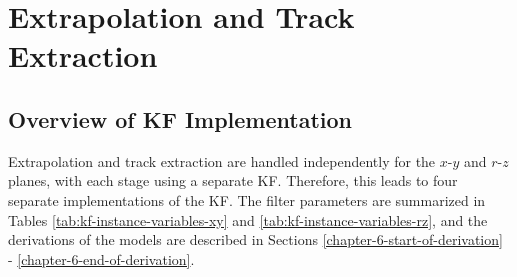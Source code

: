 \section{Extrapolation and Track Extraction}
\label{chapter-6-extrapolation-track-extraction}

\subsection{Overview of KF Implementation}
\label{chapter-6-overview-of-kf}

Extrapolation and track extraction are handled independently for the $x$-$y$ and $r$-$z$ planes, with each stage using a separate KF. Therefore, this leads to four separate implementations of the KF. The filter parameters are summarized in Tables \ref{tab:kf-instance-variables-xy} and \ref{tab:kf-instance-variables-rz}, and the derivations of the models are described in Sections \ref{chapter-6-start-of-derivation} - \ref{chapter-6-end-of-derivation}.



